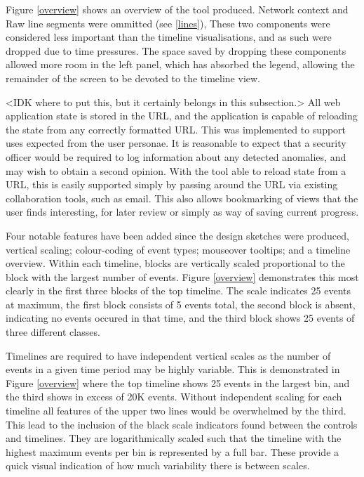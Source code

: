 Figure \ref{overview} shows an overview of the tool produced. Network context and Raw line segments were ommitted (see \ref{lines}), These two components were considered less important than the timeline visualisations, and as such were dropped due to time pressures.  The space saved by dropping these components allowed more room in the left panel, which has absorbed the legend, allowing the remainder of the screen to be devoted to the timeline view. 

<IDK where to put this, but it certainly belongs in this subsection.>
All web application state is stored in the URL, and the application is capable of reloading the state from any correctly formatted URL. This was implemented to support uses expected from the user personae. It is reasonable to expect that a security officer would be required to log information about any detected anomalies, and may wish to obtain a second opinion.
With the tool able to reload state from a URL, this is easily supported simply by passing around the URL via existing collaboration tools, such as email. 
This also allows bookmarking of views that the user finds interesting, for later review or simply as way of saving current progress. 

Four notable features have been added since the design sketches were produced, vertical scaling; colour-coding of event types; mouseover tooltips; and a timeline overview. 
Within each timeline, blocks are vertically scaled proportional to the block with the largest number of events. Figure \ref{overview} demonstrates this most clearly in the first three blocks of the top timeline. The scale indicates 25 events at maximum, the first block consists of 5 events total, the second block is absent, indicating no events occured in that time, and the third block shows 25 events of three different classes. 

Timelines are required to have independent vertical scales as the number of events in a given time period may be highly variable. This is demonstrated in Figure \ref{overview} where the top timeline shows 25 events in the largest bin, and the third shows in excess of 20K events. Without independent scaling for each timeline all features of the upper two lines would be overwhelmed by the third. This lead to the inclusion of the black scale indicators found between the controls and timelines. They are logarithmically scaled such that the timeline with the highest maximum events per bin is represented by a full bar. These provide a quick visual indication of how much variability there is between scales. 

